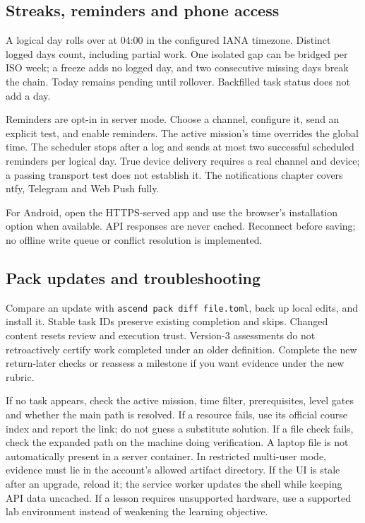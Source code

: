 \subsection{Streaks, reminders and phone access}
A logical day rolls over at 04:00 in the configured IANA timezone. Distinct logged
days count, including partial work. One isolated gap can be bridged per ISO week;
a freeze adds no logged day, and two consecutive missing days break the chain.
Today remains pending until rollover. Backfilled task status does not add a day.

Reminders are opt-in in server mode. Choose a channel, configure it, send an
explicit test, and enable reminders. The active mission's time overrides the
global time. The scheduler stops after a log and sends at most two successful
scheduled reminders per logical day. True device delivery requires a real channel
and device; a passing transport test does not establish it. The notifications
chapter covers ntfy, Telegram and Web Push fully.

For Android, open the HTTPS-served app and use the browser's installation option
when available. API responses are never cached. Reconnect before saving; no
offline write queue or conflict resolution is implemented.

\subsection{Pack updates and troubleshooting}
Compare an update with \texttt{ascend pack diff file.toml}, back up local edits,
and install it. Stable task IDs preserve existing completion and skips. Changed
content resets review and execution trust. Version-3 assessments do not
retroactively certify work completed under an older definition. Complete the new
return-later checks or reassess a milestone if you want evidence under the new rubric.

If no task appears, check the active mission, time filter, prerequisites, level
gates and whether the main path is resolved. If a resource fails, use its official
course index and report the link; do not guess a substitute solution. If a file
check fails, check the expanded path on the machine doing verification. A laptop
file is not automatically present in a server container. In restricted multi-user
mode, evidence must lie in the account's allowed artifact directory. If the UI is
stale after an upgrade, reload it; the service worker updates the shell while
keeping API data uncached. If a lesson requires unsupported hardware, use a
supported lab environment instead of weakening the learning objective.


